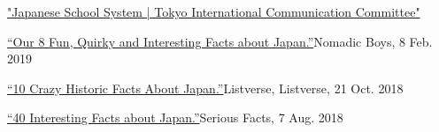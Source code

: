 \documentclass{article}
\begin{document}
\begin{thebibliography}{9}
\href{www.tokyo-icc.jp/guide_eng/educ/01.html.}{"Japanese School System | Tokyo International Communication Committee"}

\href{nomadicboys.com/8-fun-interesting-facts-about-japan/.}{“Our 8 Fun, Quirky and Interesting Facts about Japan.”}Nomadic Boys, 8 Feb. 2019

\href{listverse.com/2017/01/09/10-crazy-historic-facts-about-japan/.}{“10 Crazy Historic Facts About Japan.”}Listverse, Listverse, 21 Oct. 2018

\href{www.seriousfacts.com/japan-facts/.}{“40 Interesting Facts about Japan.”}Serious Facts, 7 Aug. 2018

 






\end{thebibliography}
 
\end{document}
